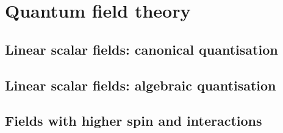 \section{Quantum field theory}

\subsection{Linear scalar fields: canonical quantisation}

\subsection{Linear scalar fields: algebraic quantisation}

\subsection{Fields with higher spin and interactions}